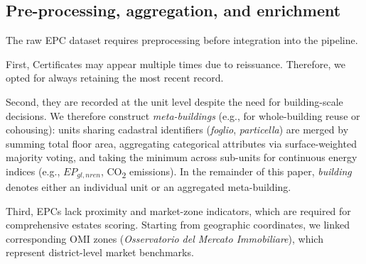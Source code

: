 \documentclass[runningheads,orivec]{llncs}
\begin{document}

\subsection{Pre-processing, aggregation, and enrichment}

The raw EPC dataset requires preprocessing before integration into the pipeline. 

First, Certificates may appear multiple times due to reissuance. Therefore, we opted for always retaining the most recent record.

Second, they are recorded at the unit level despite the need for building-scale decisions. We therefore construct \emph{meta-buildings} (e.g., for whole-building reuse or cohousing): units sharing cadastral identifiers (\textit{foglio}, \textit{particella}) are merged by summing total floor area, aggregating categorical attributes via surface-weighted majority voting, and taking the minimum across sub-units for continuous energy indices (e.g., $EP_{gl,nren}$, CO\textsubscript{2} emissions). In the remainder of this paper, \emph{building} denotes either an individual unit or an aggregated meta-building.

Third, EPCs lack proximity and market-zone indicators, which are required for comprehensive estates scoring. 
Starting from geographic coordinates, we linked corresponding OMI zones (\textit{Osservatorio del Mercato Immobiliare}), which represent district-level market benchmarks.
\end{document}

